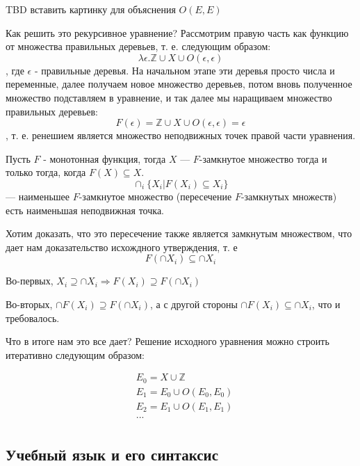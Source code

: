 TBD вставить картинку для объяснения $O\left(E,E\right)$

Как решить это рекурсивное уравнение? Рассмотрим правую часть как функцию от множества правильных деревьев, т. е. следующим образом:
$$\lambda \epsilon . \mathbb{Z}\cup X\cup O\left(\epsilon,\epsilon\right)$$,
где $\epsilon$ - правильные деревья. На начальном этапе эти деревья просто числа и переменные, далее получаем новое множество деревьев, потом вновь полученное
множество подставляем в уравнение, и так далее мы наращиваем множество правильных деревьев:
$$F\left(\epsilon\right) = \mathbb{Z}\cup X\cup O\left(\epsilon, \epsilon\right) = \epsilon$$, т. е. ренешием является множество неподвижных точек правой части
уравнения.

\begin{Th}
Пусть $F$ - монотонная функция, тогда $X$ --- $F$-замкнутое множество тогда и только тогда, когда $F\left(X\right) \subseteq X$.
$$\cap_i \{X_i | F\left(X_i\right) \subseteq X_i\}$$ --- наименьшее $F$-замкнутое множество (пересечение $F$-замкнутых множеств) есть наименьшая неподвижная точка.
\end{Th}

\begin{Proof}
Хотим доказать, что это пересечение также является замкнутым множеством, что дает нам доказательство исхождного утверждения, т. е
$$F\left(\cap X_i\right) \subseteq \cap X_i$$

Во-первых, $X_i \supseteq \cap X_i \Rightarrow F\left(X_i\right) \supseteq F\left(\cap X_i\right)$

Во-вторых, $\cap F\left(X_i\right) \supseteq F\left(\cap X_i\right)$, а с другой стороны $\cap F\left(X_i\right) \subseteq \cap X_i$, что и требовалось.
\end{Proof}

Что в итоге нам это все дает? Решение исходного уравнения можно строить итеративно следующим образом:

\[
	\begin{split}
		&E_0 = X\cup \mathbb{Z}\\
		&E_1 = E_0\cup O\left(E_0,E_0\right)\\
		&E_2 = E_1\cup O\left(E_1,E_1\right)\\
		& ... \\
	\end{split}
\]

\subsection{Учебный язык и его синтаксис}

